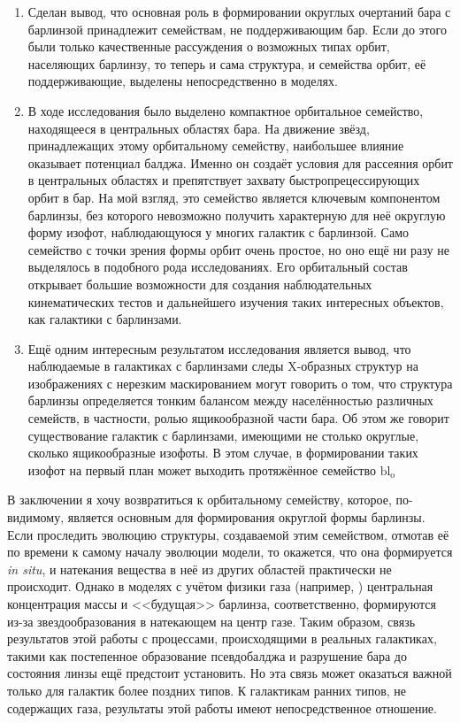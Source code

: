 \documentclass{trlnotes}
\begin{document}
\begin{enumerate}
  \item  Сделан вывод, что основная роль в формировании округлых очертаний бара с барлинзой принадлежит семействам, не поддерживающим бар. Если до этого были только качественные рассуждения о возможных типах орбит, населяющих барлинзу, то теперь и сама структура, и семейства орбит, её поддерживающие, выделены непосредственно в моделях.
  \item В ходе исследования было выделено компактное орбитальное семейство, находящееся в центральных областях бара.  На движение звёзд, принадлежащих этому орбитальному семейству, наибольшее влияние оказывает потенциал балджа. Именно он создаёт условия для рассеяния орбит в центральных областях и препятствует захвату быстропрецессирующих орбит в бар. На мой взгляд, это семейство является ключевым компонентом барлинзы, без
которого невозможно получить характерную для неё округлую форму изофот, наблюдающуюся у многих галактик с барлинзой. Само семейство с точки зрения формы орбит очень простое, но оно ещё ни разу не выделялось в подобного рода исследованиях. Его орбитальный состав открывает большие возможности для создания наблюдательных кинематических тестов и дальнейшего изучения таких интересных объектов, как галактики с барлинзами.
  \item  Ещё одним интересным результатом исследования является вывод, что наблюдаемые в галактиках с барлинзами следы X-образных структур на
    изображениях с нерезким маскированием могут говорить о том, что структура барлинзы определяется тонким балансом между населённостью различных
    семейств, в частности, ролью ящикообразной части бара. Об этом же говорит существование галактик с барлинзами, имеющими не столько
    округлые, сколько ящикообразные изофоты. В этом случае, в формировании таких изофот на первый план может выходить протяжённое семейство $\text{bl}_{\text{o}}$
\end{enumerate}
В заключении я хочу возвратиться к орбитальному семейству, которое, по-видимому, является основным для формирования округлой формы барлинзы. 
Если проследить эволюцию структуры, создаваемой этим семейством, отмотав её по времени к самому началу эволюции модели, то окажется, что она
формируется \emph{in situ}, и натекания вещества в неё из других областей практически не происходит. Однако в моделях с учётом физики газа (например, \cite{athanassoula2015}) центральная концентрация массы и <<будущая>> барлинза, соответственно, формируются из-за 
звездообразования в натекающем на центр газе. Таким образом, связь результатов этой работы с процессами, происходящими в реальных галактиках, такими
как постепенное образование псевдобалджа и разрушение бара до состояния линзы \citep{combes2011} ещё предстоит установить. Но эта связь может
оказаться важной только для галактик более поздних типов. К галактикам ранних типов, не содержащих газа, результаты этой работы имеют
непосредственное отношение.
 
\end{document}
